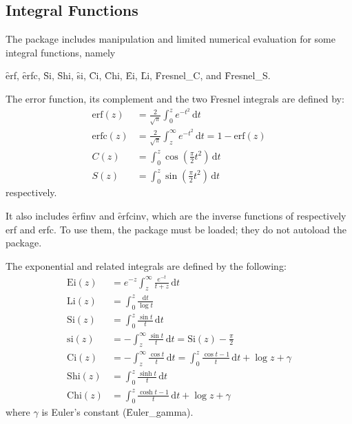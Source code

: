 \subsection{Integral Functions}
\hypertarget{operator:CHI}{}
\hypertarget{operator:CI}{}
\hypertarget{operator:DILOG}{}
\hypertarget{operator:EI}{}
\hypertarget{operator:erf}{}
\hypertarget{operator:SI}{}
\hypertarget{operator:Shi}{}
\hypertarget{operator:Fresnel_S}{}
\hypertarget{operator:Fresnel_C}{}
\hypertarget{INTEGF}{}

The  package includes manipulation and limited numerical
evaluation for some integral functions, namely

\f{erf}, \f{erfc}, \f{Si}, \f{Shi}, \f{si}, \f{Ci}, \f{Chi}, \f{Ei}, \f{Li},
\f{Fresnel\_C}, and \f{Fresnel\_S}.

The error function, its complement and the two Fresnel integrals are defined by:
\begin{align*}
\mathrm{erf}(z) & = \frac{2}{\sqrt \pi}\int_0^z e^{-t^2}\, \mathrm{d}t\\
\mathrm{erfc}(z) & = \frac{2}{\sqrt \pi}\int_z^\infty e^{-t^2}\, \mathrm{d}t
 = 1 - \mathrm{erf}(z)\\
C(z) & = \int_0^z \cos\left(\frac{\pi}{2} t^2\right)\, \mathrm{d}t\\
S(z) & = \int_0^z \sin\left(\frac{\pi}{2} t^2\right)\, \mathrm{d}t
\end{align*}
respectively.

It also includes \f{erfinv} and \f{erfcinv}, which are the inverse
functions of respectively erf and erfc.  To use them,
the  package must be loaded; they do not autoload the
package.

The exponential and related integrals are defined by the following:
\begin{align*}
\mathrm{Ei}(z) & = e^{-z}\int_z^\infty \frac{e^{-t}} {t+z}\, \mathrm{d}t\\
\mathrm{Li}(z) & = \int_0^z \frac{\mathrm{d}t} {\log t}\\
\mathrm{Si}(z) & = \int_0^z \frac{\sin t} {t}\, \mathrm{d}t\\
\mathrm{si}(z) & = -\int_z^\infty \frac{\sin t} {t}\, \mathrm{d}t
 = \mathrm{Si}(z) - \frac{\pi}{2}\\
\mathrm{Ci}(z) & = -\int_z^\infty  \frac{\cos t} {t}\, \mathrm{d}t
=  \int_0^z \frac{\cos t -1} {t}\, \mathrm{d}t + \log z +\gamma\\
\mathrm{Shi}(z) & = \int_0^z \frac{\sinh t} {t}\, \mathrm{d}t\\
\mathrm{Chi}(z) & = \int_0^z \frac{\cosh t -1} {t}\, \mathrm{d}t +\log z +\gamma
\end{align*}
where $\gamma$ is Euler's constant (\f{Euler\_gamma}).

